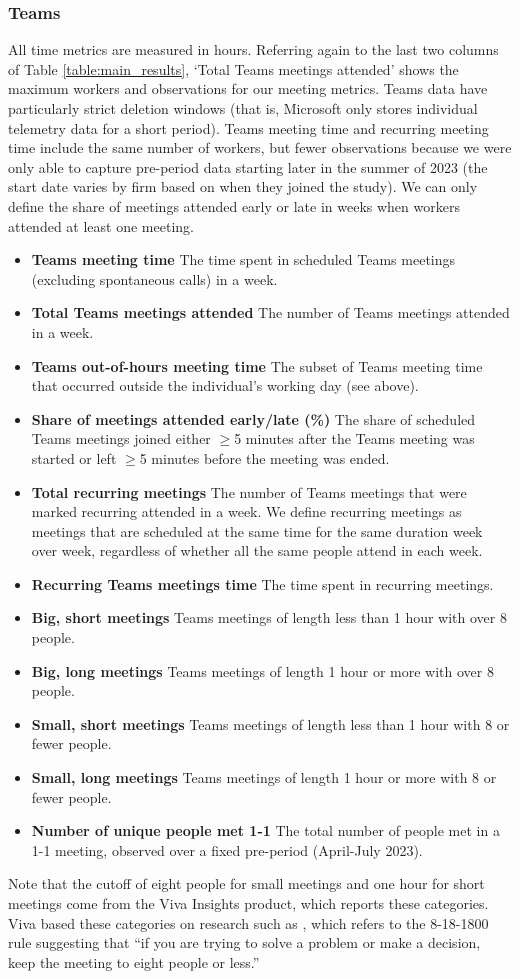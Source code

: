 \documentclass{article}
\newcommand{\bitem}[1]{\item \textbf{#1}}
\begin{document}
 \subsubsection{Teams}
 All time metrics are measured in hours. Referring again to the last two columns of Table \ref{table:main_results}, `Total Teams meetings attended' shows the maximum workers and observations for our meeting metrics. Teams data have particularly strict deletion windows (that is, Microsoft only stores individual telemetry data for a short period). Teams meeting time and recurring meeting time include the same number of workers, but fewer observations because we were only able to capture pre-period data starting later in the summer of 2023 (the start date varies by firm based on when they joined the study). We can only define the share of meetings attended early or late in weeks when workers attended at least one meeting.
 
 \begin{itemize}[noitemsep]
     \bitem{Teams meeting time} The time spent in scheduled Teams meetings (excluding spontaneous calls)  in a week.
      \bitem{Total Teams meetings attended} The number of Teams meetings attended in a week.
     \bitem{Teams out-of-hours meeting time} The subset of Teams meeting time that occurred outside the individual's working day (see above).
     \bitem{Share of meetings attended early/late (\%)} The share of scheduled Teams meetings joined either $\geq$5 minutes after the Teams meeting was started or left $\geq$5 minutes before the meeting was ended.
    \bitem{Total recurring meetings} The number of Teams meetings that were marked recurring attended in a week. We define recurring meetings as meetings that are scheduled at the same time for the same duration week over week, regardless of whether all the same people attend in each week.
     \bitem{Recurring Teams meetings time} The time spent in recurring meetings.
     \bitem{Big, short meetings} Teams meetings of length less than 1 hour with over 8 people.
     \bitem{Big, long meetings} Teams meetings of length 1 hour or more with over 8 people.
     \bitem{Small, short meetings} Teams meetings of length less than 1 hour with 8 or fewer people.
     \bitem{Small, long meetings} Teams meetings of length 1 hour or more with 8 or fewer people.
     \bitem{Number of unique people met 1-1} The total number of people met in a 1-1 meeting, observed over a fixed pre-period (April-July 2023).
 \end{itemize}
  Note that the cutoff of eight people for small meetings and one hour for short meetings come from the Viva Insights product, which reports these categories. Viva based these categories on research such as \cite{rogelberg2019surprising}, which refers to the 8-18-1800 rule suggesting that ``if you are trying to solve a problem or make a decision, keep the meeting to eight people or less.'' 
\end{document}
